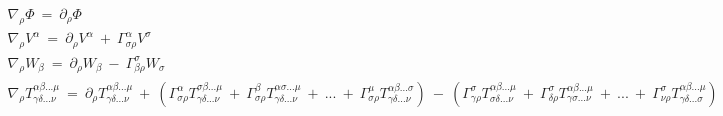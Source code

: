 \begin{gather}
  \nabla_{\rho}\Phi\ =\ \partial_{\rho}\Phi \\
  \nabla_{\rho}V^{\alpha}\ =\ \partial_{\rho}V^{\alpha}\ +\ \Gamma^{\alpha}_{\sigma\rho}V^{\sigma} \\
  \nabla_{\rho}W_{\beta}\ =\ \partial_{\rho}W_{\beta}\ -\ \Gamma^{\sigma}_{\beta\rho}W_{\sigma} \\
  \nabla_{\rho}T^{\alpha\beta...\mu}_{\gamma\delta...\nu}\ =\
  \partial_{\rho}T^{\alpha\beta...\mu}_{\gamma\delta...\nu}\ 
  +\ \left (\Gamma^{\alpha}_{\sigma\rho}T^{\sigma\beta...\mu}_{\gamma\delta...\nu}\ +\
  \Gamma^{\beta}_{\sigma\rho}T^{\alpha\sigma...\mu}_{\gamma\delta...\nu}\ +\ ...\ +\ 
  \Gamma^{\mu}_{\sigma\rho}T^{\alpha\beta...\sigma}_{\gamma\delta...\nu}\right )\
  -\ \left (\Gamma^{\sigma}_{\gamma\rho}T^{\alpha\beta...\mu}_{\sigma\delta...\nu}\ +\
  \Gamma^{\sigma}_{\delta\rho}T^{\alpha\beta...\mu}_{\gamma\sigma...\nu}\ +\ ...\ +\
  \Gamma^{\sigma}_{\nu\rho}T^{\alpha\beta...\mu}_{\gamma\delta...\sigma}\right )
\end{gather}

